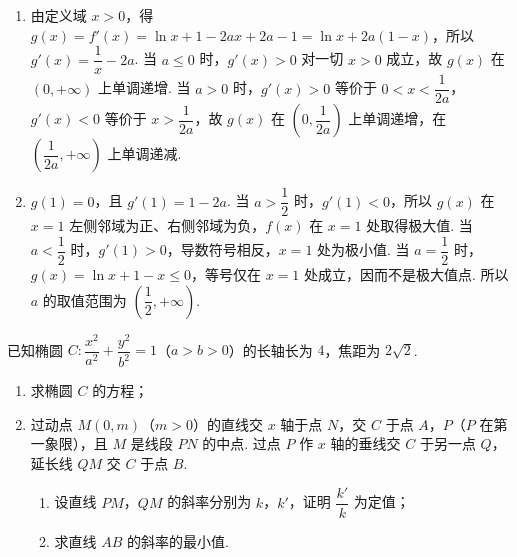 \begin{solution}
\begin{enumerate}
\item 由定义域 \(x>0\)，得 \(g(x)=f'(x)=\ln x+1-2ax+2a-1=\ln x+2a(1-x)\)，所以 \(g'(x)=\dfrac1x-2a\). 当 \(a\leq0\) 时，\(g'(x)>0\) 对一切 \(x>0\) 成立，故 \(g(x)\) 在 \((0,+\infty)\) 上单调递增. 当 \(a>0\) 时，\(g'(x)>0\) 等价于 \(0<x<\dfrac1{2a}\)，\(g'(x)<0\) 等价于 \(x>\dfrac1{2a}\)，故 \(g(x)\) 在 \(\left(0,\dfrac1{2a}\right)\) 上单调递增，在 \(\left(\dfrac1{2a},+\infty\right)\) 上单调递减.
\item \(g(1)=0\)，且 \(g'(1)=1-2a\). 当 \(a>\dfrac12\) 时，\(g'(1)<0\)，所以 \(g(x)\) 在 \(x=1\) 左侧邻域为正、右侧邻域为负，\(f(x)\) 在 \(x=1\) 处取得极大值. 当 \(a<\dfrac12\) 时，\(g'(1)>0\)，导数符号相反，\(x=1\) 处为极小值. 当 \(a=\dfrac12\) 时，\(g(x)=\ln x+1-x\leq0\)，等号仅在 \(x=1\) 处成立，因而不是极大值点. 所以 \(a\) 的取值范围为 \(\left(\dfrac12,+\infty\right)\).
\end{enumerate}
\end{solution}

\begin{problem}
已知椭圆 \(C:\dfrac{x^2}{a^2}+\dfrac{y^2}{b^2}=1\)（\(a>b>0\)）的长轴长为 \(4\)，焦距为 \(2\sqrt2\).

\begin{enumerate}
\item 求椭圆 \(C\) 的方程；
\item 过动点 \(M(0,m)\)（\(m>0\)）的直线交 \(x\) 轴于点 \(N\)，交 \(C\) 于点 \(A\)，\(P\)（\(P\) 在第一象限），且 \(M\) 是线段 \(PN\) 的中点. 过点 \(P\) 作 \(x\) 轴的垂线交 \(C\) 于另一点 \(Q\)，延长线 \(QM\) 交 \(C\) 于点 \(B\).
    \begin{enumerate}
    \item 设直线 \(PM\)，\(QM\) 的斜率分别为 \(k\)，\(k'\)，证明 \(\dfrac{k'}{k}\) 为定值；
    \item 求直线 \(AB\) 的斜率的最小值.
    \end{enumerate}
\end{enumerate}

\end{problem}

